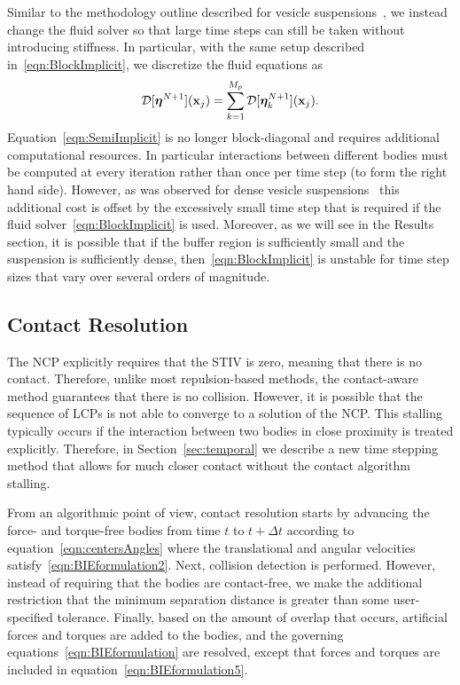\documentclass[preprint, 10pt]{elsarticle}
\begin{document}
Similar to the methodology
outline described for vesicle suspensions~\cite{Quaife2014}, we instead
change the fluid solver so that large time steps can still be taken
without introducing stiffness.  In particular, with the same setup
described in~\eqref{eqn:BlockImplicit}, we discretize the fluid
equations as
\begin{align}
  {\mathcal{D}}[{\boldsymbol\eta}^{N+1}]({\mathbf{x}}_j) = 
  \sum_{k=1}^{M_p} {\mathcal{D}}[{\boldsymbol\eta}^{N+1}_k]({\mathbf{x}}_j).
  \label{eqn:SemiImplicit}
\end{align}
Equation~\eqref{eqn:SemiImplicit} is no longer block-diagonal and requires additional computational
resources. In particular
interactions between different bodies must be computed at every
iteration rather than once per time step (to form the right hand side).
However, as was observed for dense vesicle suspensions~\cite{Quaife2014, Rahimian2015} this
additional cost is offset by the
excessively small time step that is required if the fluid
solver~\eqref{eqn:BlockImplicit} is used.  Moreover, as we will see in
the Results section, it is possible that if the buffer region is
sufficiently small and the suspension is sufficiently dense,
then~\eqref{eqn:BlockImplicit} is unstable for time step sizes that vary
over several orders of magnitude.

\subsection{Contact Resolution}
\label{sec:contact}
The NCP explicitly requires that the STIV is zero, meaning that there is
no contact.  Therefore, unlike most repulsion-based methods, the
contact-aware method guarantees that there is no collision.  However, it
is possible that the sequence of LCPs is not able to converge to a
solution of the NCP.  This stalling typically occurs if the interaction
between two bodies in close proximity is treated explicitly.
Therefore, in Section~\ref{sec:temporal} we describe a new time stepping
method that allows for much closer contact without the contact algorithm
stalling.


From an algorithmic point of view, contact resolution starts by
advancing the force- and torque-free bodies from time $t$ to $t +
\Delta t$ according to equation~\eqref{eqn:centersAngles} where the
translational and angular velocities satisfy~\eqref{eqn:BIEformulation2}.
Next, collision detection is performed.  However, instead of requiring
that the bodies are contact-free, we make the additional restriction
that the minimum separation distance is greater than some user-specified
tolerance.  Finally, based on the amount of overlap that occurs,
artificial forces and torques are added to the bodies, and the governing
equations~\eqref{eqn:BIEformulation} are resolved, except that forces
and torques are included in equation~\eqref{eqn:BIEformulation5}.  
\end{document}
